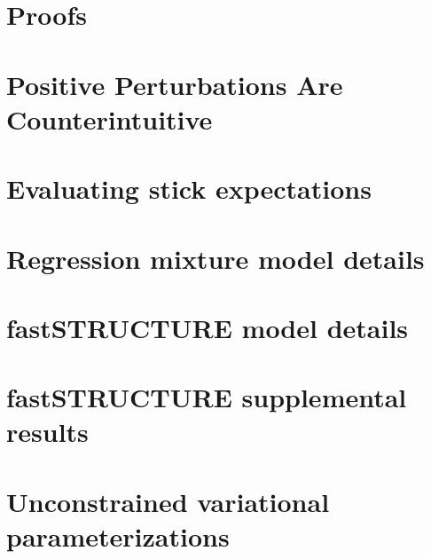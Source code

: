 \documentclass[ba]{imsart}
\begin{document}

\appendix

\section{Proofs}


\section{Positive Perturbations Are Counterintuitive}


\section{Evaluating stick expectations}


\section{Regression mixture model details}


\section{fastSTRUCTURE model details}


\section{fastSTRUCTURE supplemental results}


\section{Unconstrained variational parameterizations}

\end{document}
